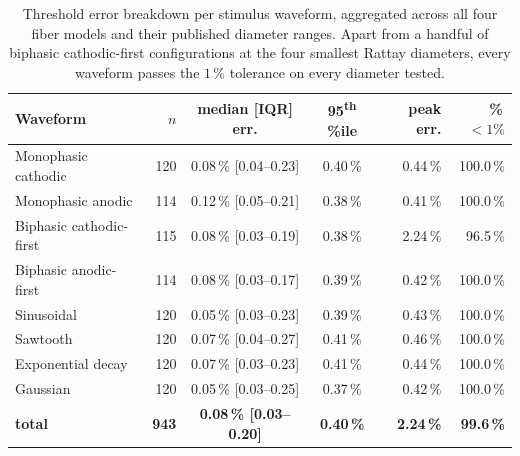 \begin{table}[h]
  \centering
  \caption{Threshold error breakdown per stimulus waveform,
    aggregated across all four fiber models and their published
    diameter ranges.  Apart from a handful of biphasic cathodic-first
    configurations at the four smallest Rattay diameters, every
    waveform passes the $1\,\%$ tolerance on every diameter tested.}
  \label{tab:validation-sd-per-wf}
  \begin{tabular}{lrccrr}
    \toprule
    Waveform & $n$ & median [IQR] err. & 95\textsuperscript{th} \%ile & peak err. & \%\,$<1\%$ \\
    \midrule
    Monophasic cathodic       & 120 & 0.08\,\% [0.04--0.23] & 0.40\,\% & 0.44\,\% & 100.0\,\% \\
    Monophasic anodic         & 114 & 0.12\,\% [0.05--0.21] & 0.38\,\% & 0.41\,\% & 100.0\,\% \\
    Biphasic cathodic-first   & 115 & 0.08\,\% [0.03--0.19] & 0.38\,\% & 2.24\,\% &  96.5\,\% \\
    Biphasic anodic-first     & 114 & 0.08\,\% [0.03--0.17] & 0.39\,\% & 0.42\,\% & 100.0\,\% \\
    Sinusoidal                & 120 & 0.05\,\% [0.03--0.23] & 0.39\,\% & 0.43\,\% & 100.0\,\% \\
    Sawtooth                  & 120 & 0.07\,\% [0.04--0.27] & 0.41\,\% & 0.46\,\% & 100.0\,\% \\
    Exponential decay         & 120 & 0.07\,\% [0.03--0.23] & 0.41\,\% & 0.44\,\% & 100.0\,\% \\
    Gaussian                  & 120 & 0.05\,\% [0.03--0.25] & 0.37\,\% & 0.42\,\% & 100.0\,\% \\
    \midrule
    \textbf{total}           & \textbf{943} & \textbf{0.08\,\% [0.03--0.20]} & \textbf{0.40\,\%} & \textbf{2.24\,\%} & \textbf{99.6\,\%} \\
    \bottomrule
  \end{tabular}
\end{table}

